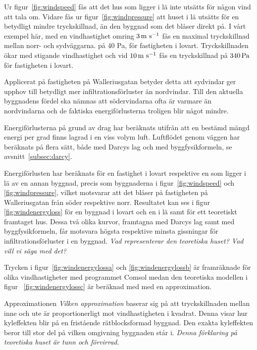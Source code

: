 Ur figur~\ref{fig:windspeed} fås att det hus som ligger i lä inte utsätts för någon vind att tala om.
 Vidare fås ur figur~\ref{fig:windpressure} att huset i lä utsätts för en betydligt mindre 
 tryckskillnad, än den byggnad som det blåser direkt på. I vårt exempel här, med en 
 vindhastighet omring $\unit[3]{m~s^{-1}}$ fås en maximal tryckskillnad mellan norr- och sydväggarna.
 på 40 Pa, för fastigheten i lovart. Tryckskillnaden ökar med stigande vindhastighet och vid $\unit[10]{m~s^{-1}}$ fås en 
 tryckskillnad på $\unit[340]{Pa}$ för fastigheten i lovart. 

Applicerat på fastigheten på Walleriusgatan betyder detta att sydvindar ger upphov till 
betydligt mer infiltrationsförluster än nordvindar. Till den aktuella byggnadens fördel ska nämnas 
att södervindarna ofta är varmare än nordvindarna och de faktiska energiförlusterna 
troligen blir något mindre.


Energiförlusterna på grund av drag har beräknats utifrån att en bestämd mängd energi per grad finns lagrad i en viss volym luft. Luftflödet genom väggen har beräknats på flera sätt, både med Darcys lag och med byggfysikformeln, se avsnitt~\ref{subsec:darcy}.

Energiförlusten har beräknats
  för en fastighet i lovart respektive en som ligger i lä av en annan byggnad, precis som 
  byggnaderna i figur~\ref{fig:windspeed} och \ref{fig:windpressure}, vilket motsvarar att det 
  blåser på fastigheten på Walleriusgatan från söder respektive norr. Resultatet kan ses i figur~
  \ref{fig:windenergyloss} för en byggnad i lovart och en i lä samt för ett teoretiskt framtaget hus. Dessa två olika kurvor, framtagna med Darcys lag samt med byggfysikformeln, får motsvara högsta respektive minsta gissningar för infiltrationsförluster i en byggnad. \emph{\color{red} Vad representerar den teoretiska huset? Vad vill vi säga med det?}

Trycken i figur~\ref{fig:windenergylossa} och \ref{fig:windenergylossb} är framräknade för 
olika vindhastigheter med programmet Comsol medan den teoretiska modellen i figur~
\ref{fig:windenergylossc} är beräknad med med en approximation. 

Approximationen\emph{\color{red} Vilken approximation} baserar sig på att tryckskillnaden mellan inne och ute är proportionerligt mot vindhastigheten i kvadrat. Denna visar hur kyleffekten blir på en fristående rätblocksformad byggnad. Den exakta kyleffekten beror till stor del på vilken omgivning byggnaden står i. \emph{\color{red} Denna förklaring på teoretiska huset är tunn och förvirrad.}


